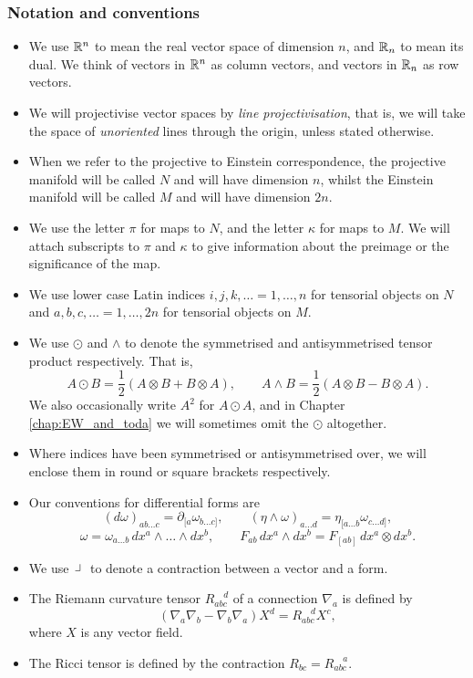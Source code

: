 \subsubsection{Notation and conventions}
\begin{itemize}
\item We use $\mathbb{R}^n$ to mean the real vector space of dimension $n$, and $\mathbb{R}_n$ to mean its dual. We think of vectors in $\mathbb{R}^n$ as column vectors, and vectors in $\mathbb{R}_n$ as row vectors.
\item We will projectivise vector spaces by \textit{line projectivisation}, that is, we will take the space of \textit{unoriented} lines through the origin, unless stated otherwise.
\item When we refer to the projective to Einstein correspondence, the projective manifold will be called $N$ and will have dimension $n$, whilst the Einstein manifold will be called $M$ and will have dimension $2n$.
\item We use the letter $\pi$ for maps to $N$, and the letter $\kappa$ for maps to $M$. We will attach subscripts to $\pi$ and $\kappa$ to give information about the preimage or the significance of the map.
\item We use lower case Latin indices $i,j,k,\dots=1,\dots,n$ for tensorial objects on $N$ and $a,b,c,\dots=1,\dots,2n$ for tensorial objects on $M$.
\item We use $\odot$ and $\wedge$ to denote the symmetrised and antisymmetrised tensor product respectively. That is,
\[
A\odot B = \frac{1}{2}(A\otimes B + B\otimes A),\qquad A\wedge B = \frac{1}{2}(A\otimes B - B\otimes A).
\]
We also occasionally write $A^2$ for $A\odot A$, and in Chapter \ref{chap:EW_and_toda} we will sometimes omit the $\odot$ altogether.
\item Where indices have been symmetrised or antisymmetrised over, we will enclose them in round or square brackets respectively.
\item Our conventions for differential forms are
\[
(d\omega)_{ab\dots c}=\partial_{[a}\omega_{b\dots c]},\qquad (\eta\wedge\omega)_{a\dots d}=\eta_{[a\dots b}\omega_{c\dots d]},\]
\[
\omega=\omega_{a\dots b}\,dx^{a}\wedge\dots\wedge dx^{b}, \qquad F_{ab}\,{d}x^{a}\wedge{d}x^{b}=F_{[ab]}\,{d}x^{a}\otimes{d}x^{b}.
\]
\item We use $\hook$ to denote a contraction between a vector and a form.
\item The Riemann curvature tensor $R_{abc}^{\quad d}$ of a connection $\nabla_a$ is defined by
\[
(\nabla_a\nabla_b - \nabla_b\nabla_a)X^d = R_{abc}^{\quad d}X^c,
\]
where $X$ is any vector field.
\item The Ricci tensor is defined by the contraction $R_{bc} = R_{abc}^{\quad a}$.
\end{itemize}


